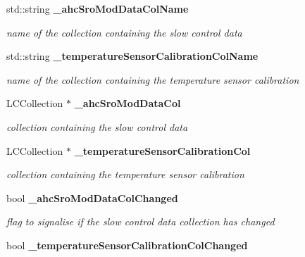 \begin{DoxyCompactItemize}
\item 
std\-::string {\bf \-\_\-ahc\-Sro\-Mod\-Data\-Col\-Name}\label{classCALICE_1_1SiPMTemperatureProcessor_a20b373be23412e6f4c10fb83f341c365}

\begin{DoxyCompactList}\small\item\em name of the collection containing the slow control data \end{DoxyCompactList}\item 
std\-::string {\bf \-\_\-temperature\-Sensor\-Calibration\-Col\-Name}\label{classCALICE_1_1SiPMTemperatureProcessor_a7f729d260699eb7bac4949150379b621}

\begin{DoxyCompactList}\small\item\em name of the collection containing the temperature sensor calibration \end{DoxyCompactList}\item 
L\-C\-Collection $\ast$ {\bf \-\_\-ahc\-Sro\-Mod\-Data\-Col}\label{classCALICE_1_1SiPMTemperatureProcessor_ab6f1a7bd77b6d74ad05d28ae00f92a96}

\begin{DoxyCompactList}\small\item\em collection containing the slow control data \end{DoxyCompactList}\item 
L\-C\-Collection $\ast$ {\bf \-\_\-temperature\-Sensor\-Calibration\-Col}\label{classCALICE_1_1SiPMTemperatureProcessor_a83f01ec9192ad50fa91b8ef05bbfe0d1}

\begin{DoxyCompactList}\small\item\em collection containing the temperature sensor calibration \end{DoxyCompactList}\item 
bool {\bf \-\_\-ahc\-Sro\-Mod\-Data\-Col\-Changed}\label{classCALICE_1_1SiPMTemperatureProcessor_addb8e35a9df5dea954ea49672e467fe3}

\begin{DoxyCompactList}\small\item\em flag to signalise if the slow control data collection has changed \end{DoxyCompactList}\item 
bool {\bf \-\_\-temperature\-Sensor\-Calibration\-Col\-Changed}\label{classCALICE_1_1SiPMTemperatureProcessor_af6e3e77f027c314019afaa41617dc57f}


\end{DoxyCompactItemize}
